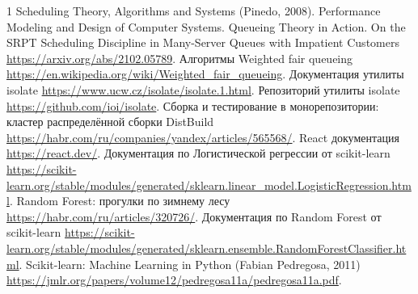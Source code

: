 \documentclass[a4paper,article,14pt]{extarticle}
\begin{document}


\tableofcontents
\pagebreak



















\begin{thebibliography}{1}
     Scheduling Theory, Algorithms and Systems (Pinedo, 2008).
     Performance Modeling and Design of Computer Systems. Queueing Theory in Action.
     On the SRPT Scheduling Discipline in Many-Server Queues with Impatient Customers \url{https://arxiv.org/abs/2102.05789}.
     Алгоритмы Weighted fair queueing \url{https://en.wikipedia.org/wiki/Weighted_fair_queueing}.
     Документация утилиты isolate \url{https://www.ucw.cz/isolate/isolate.1.html}.
     Репозиторий утилиты isolate \url{https://github.com/ioi/isolate}.
     Сборка и тестирование в монорепозитории: кластер распределённой сборки DistBuild \url{https://habr.com/ru/companies/yandex/articles/565568/}.
     React документация \url{https://react.dev/}.
     Документация по Логистической регрессии от scikit-learn \url{https://scikit-learn.org/stable/modules/generated/sklearn.linear_model.LogisticRegression.html}.
     Random Forest: прогулки по зимнему лесу \url{https://habr.com/ru/articles/320726/}.
     Документация по Random Forest от scikit-learn \url{https://scikit-learn.org/stable/modules/generated/sklearn.ensemble.RandomForestClassifier.html}.
     Scikit-learn: Machine Learning in Python (Fabian Pedregosa, 2011) \url{https://jmlr.org/papers/volume12/pedregosa11a/pedregosa11a.pdf}.
\end{thebibliography}
\end{document}
